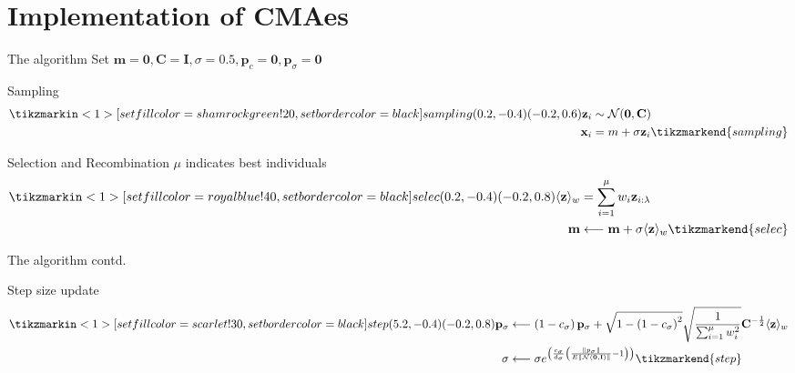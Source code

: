 \documentclass[presentation]{beamer}
\begin{document}
\section{Implementation of CMAes}
\label{sec:orgfa99f1d}
\begin{frame}[label={sec:orge7ccf84}]{The algorithm}
Set \(\mathbf{m} = \mathbf{0}, \mathbf{C} = \mathbf{I}, \sigma =
 0.5, \mathbf{p}_c = \mathbf{0}, \mathbf{p}_{\sigma} = \mathbf{0}\)
\begin{block}{Sampling}
\[ \begin{aligned}
	  \tikzmarkin<1>[set fill color=shamrockgreen!20, set border color=black]{sampling}(0.2,-0.4)(-0.2,0.6)
	  \mathbf{z}_{i} & \sim \mathcal{N}(\mathbf{0}, \mathbf{C}) \\
	  \mathbf{x}_{i} &= m+\sigma \mathbf{z}_{i} \tikzmarkend{sampling}
	  \end{aligned} \]
\end{block}

\begin{block}{Selection and Recombination}
\(\mu\) indicates best individuals
  \[ \begin{aligned}
	  \tikzmarkin<1>[set fill color=royalblue!40, set border color=black]{selec}(0.2,-0.4)(-0.2,0.8)
	  \langle\mathbf{z}\rangle_{w} &= \sum_{i=1}^{\mu} w_{i} \mathbf{z}_{i : \lambda} \\
	  \mathbf{m} &\longleftarrow \mathbf{m}+\sigma\langle\mathbf{z}\rangle_{w} \tikzmarkend{selec}
	  \end{aligned} \]
\end{block}
\end{frame}

\begin{frame}[label={sec:orge7ecfa3}]{The algorithm contd.}
\begin{block}{Step size update}
\[ \begin{aligned}
	 \tikzmarkin<1>[set fill color=scarlet!30, set border color=black]{step}(5.2,-0.4)(-0.2,0.8)
	 \mathbf{p}_{\sigma} &\longleftarrow\left(1-c_{\sigma}\right)
	 \mathbf{p}_{\sigma}+\sqrt{1-\left(1-c_{\sigma}\right)^{2}}
	 \sqrt{\frac{1}{\sum_{i=1}^{\mu} w_{i}^{2}}}
	 \mathbf{C}^{-\frac{1}{2}}\langle\mathbf{z}\rangle_{w} \\
	 \sigma &\longleftarrow \sigma
	 e^{\left(\frac{c_\sigma}{d_{\sigma}}\left(\frac{\left\|p_{\sigma}\right\|}{E\|\mathcal{N}(\mathbf{0},
	 \mathbf{I})\|}-1\right)\right)} \tikzmarkend{step}
	 \end{aligned} \]
\end{block}
\end{frame}
\end{document}
